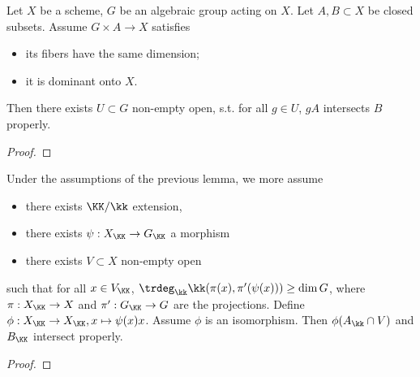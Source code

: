   \begin{lemma}
    Let $X$ be a scheme, $G$ be an algebraic group acting on $X$.
    Let $A,B \subset X$ be closed subsets.
    Assume $G\times A \to X$ satisfies
    \begin{itemize}
      \item its fibers have the same dimension;
      \item it is dominant onto $X$.
    \end{itemize}
    Then there exists $U \subset G$ non-empty open, s.t. for all $g \in U$, $gA$ intersects $B$ properly.
  \end{lemma}
  \begin{proof}
    \Yang{}
  \end{proof}

  \begin{lemma}
    Under the assumptions of the previous lemma, we more assume 
    \begin{itemize}
      \item there exists $\KK/\kk$ extension,
      \item there exists $\psi: X_\KK \to G_\KK$ a morphism
      \item there exists $V \subset X$ non-empty open
    \end{itemize}
    such that for all $x \in V_\KK$, $\trdeg_\kk \kk(\pi(x), \pi'(\psi(x))) \geq \dim G$, where $\pi: X_\KK \to X$ and $\pi': G_\KK \to G$ are the projections.
    Define $\phi: X_\KK \to X_\KK, x \mapsto \psi(x)x$.
    Assume $\phi$ is an isomorphism.
    Then $\phi(A_\kk \cap V)$ and $B_\KK$ intersect properly.
  \end{lemma}
  \begin{proof}
    \Yang{}
  \end{proof}